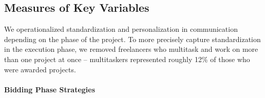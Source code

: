 \subsection{Measures of Key Variables}

We operationalized standardization and personalization in communication depending on the phase of the project. To more precisely capture standardization in the execution phase, we removed freelancers who multitask and work on more than one project at once -- multitaskers represented roughly 12\% of those who were awarded projects.

\paragraph{Bidding Phase Strategies}  
  \setlength\itemsep{1em}

